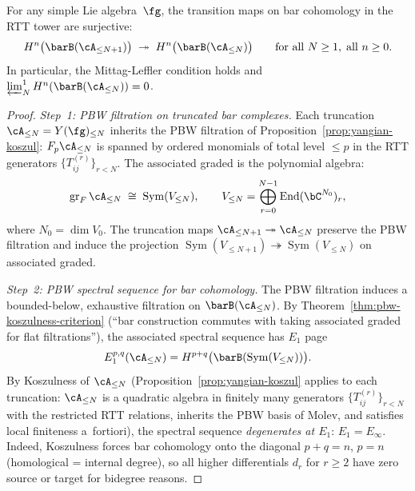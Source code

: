 \begin{theorem}
\label{thm:rtt-mittag-leffler}
For any simple Lie algebra~$\fg$, the transition maps on bar
cohomology in the RTT tower are surjective:
\[
H^n\bigl(\barB(\cA_{\leq N+1})\bigr)
\;\twoheadrightarrow\;
H^n\bigl(\barB(\cA_{\leq N})\bigr)
\qquad \text{for all } N \geq 1, \;\text{all } n \geq 0.
\]
In particular, the Mittag-Leffler condition holds and
$\varprojlim^1_N H^n(\barB(\cA_{\leq N})) = 0$.
\end{theorem}

\begin{proof}
\emph{Step~1: PBW filtration on truncated bar complexes.}
Each truncation $\cA_{\leq N} = Y(\fg)_{\leq N}$ inherits the
PBW filtration of Proposition~\ref{prop:yangian-koszul}:
$F_p \cA_{\leq N}$ is spanned by ordered monomials of total
level $\leq p$ in the RTT generators $\{T_{ij}^{(r)}\}_{r < N}$.
The associated graded is the polynomial algebra:
\[
\operatorname{gr}_F \cA_{\leq N}
\;\cong\;
\operatorname{Sym}(V_{\leq N}),
\qquad
V_{\leq N} = \bigoplus_{r=0}^{N-1}
\operatorname{End}(\bC^{N_0})_r,
\]
where $N_0 = \dim V_0$.  The truncation maps
$\cA_{\leq N+1} \twoheadrightarrow \cA_{\leq N}$ preserve the
PBW filtration and induce the projection
$\operatorname{Sym}(V_{\leq N+1}) \twoheadrightarrow
\operatorname{Sym}(V_{\leq N})$ on associated graded.

\emph{Step~2: PBW spectral sequence for bar cohomology.}
The PBW filtration induces a bounded-below, exhaustive filtration
on $\barB(\cA_{\leq N})$.  By
Theorem~\ref{thm:pbw-koszulness-criterion} (``bar construction
commutes with taking associated graded for flat filtrations''),
the associated spectral sequence has $E_1$ page
\[
E_1^{p,q}(\cA_{\leq N})
= H^{p+q}\bigl(\barB(\operatorname{Sym}(V_{\leq N}))\bigr).
\]
By Koszulness of $\cA_{\leq N}$
(Proposition~\ref{prop:yangian-koszul} applies to each truncation:
$\cA_{\leq N}$ is a quadratic algebra in finitely many generators
$\{T_{ij}^{(r)}\}_{r < N}$ with the restricted RTT relations, inherits
the PBW basis of Molev, and satisfies local finiteness a~fortiori),
the spectral sequence \emph{degenerates at $E_1$}:
$E_1 = E_\infty$.  Indeed, Koszulness forces bar cohomology
onto the diagonal $p + q = n$, $p = n$ (homological = internal
degree), so all higher differentials $d_r$ for $r \geq 2$ have
zero source or target for bidegree reasons.


\end{proof}
